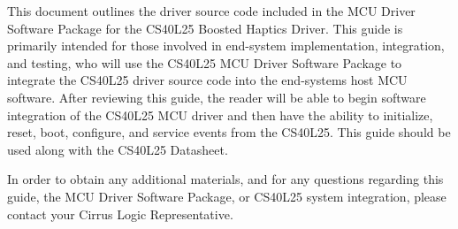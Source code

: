 This document outlines the driver source code included in the M\+CU Driver Software Package for the C\+S40\+L25 Boosted Haptics Driver. This guide is primarily intended for those involved in end-\/system implementation, integration, and testing, who will use the C\+S40\+L25 M\+CU Driver Software Package to integrate the C\+S40\+L25 driver source code into the end-\/system\textquotesingle{}s host M\+CU software. After reviewing this guide, the reader will be able to begin software integration of the C\+S40\+L25 M\+CU driver and then have the ability to initialize, reset, boot, configure, and service events from the C\+S40\+L25. This guide should be used along with the C\+S40\+L25 Datasheet.

In order to obtain any additional materials, and for any questions regarding this guide, the M\+CU Driver Software Package, or C\+S40\+L25 system integration, please contact your Cirrus Logic Representative. 